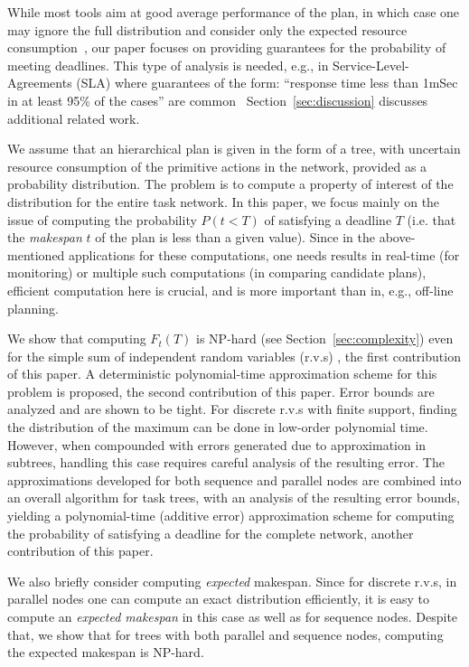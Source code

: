 \documentclass{article}
\begin{document}
While most tools aim at good average performance of the plan, in which case one may ignore the 
full distribution and consider only the expected resource consumption~\cite{bonfietti2014disregarding}, our paper focuses
on providing guarantees for the probability of meeting deadlines. This type of analysis is needed, e.g., in
Service-Level-Agreements (SLA) where guarantees of the form: ``response time less than 1mSec in at least 95\% of the cases'' are common~\cite{buyya2011sla} 
Section~\ref{sec:discussion} discusses additional related work.

We assume that an hierarchical plan is given in the form of a tree, with uncertain resource consumption of the primitive actions
in the network, provided as a probability distribution. The problem is to compute
a property of interest of the distribution for the entire task network.
In this paper, we focus mainly on the issue of computing the probability $P(t<T)$ of satisfying a deadline $T$
(i.e. that the {\em makespan} $t$ of the plan is less than a given value).
Since in the above-mentioned applications for these computations, one needs results in real-time (for monitoring) or
multiple such computations (in comparing candidate plans), efficient computation here is crucial, and is more
important than in, e.g., off-line planning.

We show that computing $F_{t}(T)$ is NP-hard (see Section~\ref{sec:complexity}) even for the
simple sum of independent random variables (r.v.s) , the first contribution of this paper. A deterministic polynomial-time approximation scheme for
this problem is proposed, the second contribution of this paper. Error bounds are analyzed and are shown to be tight.
For discrete r.v.s with finite support, finding the distribution of the maximum can be done in low-order polynomial time.
However, when compounded with errors generated due to approximation in subtrees, handling this case requires careful
analysis of the resulting error.
The approximations developed for both sequence and parallel nodes are combined into an overall
algorithm for task trees, with an analysis of the resulting error bounds, yielding a polynomial-time (additive error) approximation scheme for computing the
probability of satisfying a deadline for the complete network, another contribution of this paper. 

We also briefly consider computing {\em expected} makespan. Since for discrete r.v.s, in parallel nodes one can compute an
exact distribution efficiently, it is easy to compute an {\em expected makespan} in this case as well as for sequence nodes. Despite that, 
we show that for trees with both parallel
and sequence nodes, computing the expected makespan is NP-hard.
\end{document}
